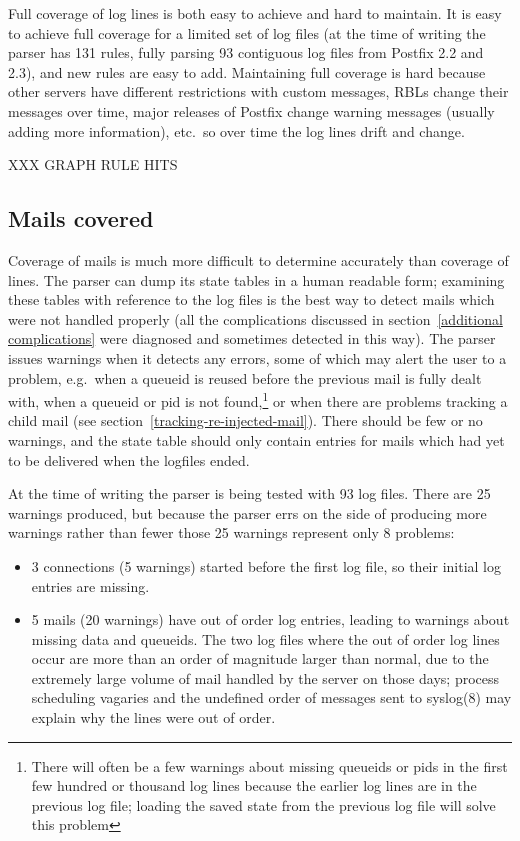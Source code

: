 \documentclass[a4paper,12pt,draft]{article}
\begin{document}
Full coverage of log lines is both easy to achieve and hard to maintain.
It is easy to achieve full coverage for a limited set of log files (at the
time of writing the parser has 131 rules, fully parsing 93 contiguous log
files from Postfix 2.2 and 2.3), and new rules are easy to add.
Maintaining full coverage is hard because other servers have different
restrictions with custom messages, RBLs change their messages over time,
major releases of Postfix change warning messages (usually adding more
information), etc.\ so over time the log lines drift and change.

XXX GRAPH RULE HITS

\subsection{Mails covered}

\label{mails-covered}

Coverage of mails is much more difficult to determine accurately than
coverage of lines.  The parser can dump its state tables in a human
readable form; examining these tables with reference to the log files is
the best way to detect mails which were not handled properly (all the
complications discussed in section~\ref{additional complications} were
diagnosed and sometimes detected in this way).  The parser issues warnings
when it detects any errors, some of which may alert the user to a problem,
e.g.\ when a queueid is reused before the previous mail is fully dealt
with, when a queueid or pid is not found,\footnote{There will often be a
few warnings about missing queueids or pids in the first few hundred or
thousand log lines because the earlier log lines are in the previous log
file; loading the saved state from the previous log file will solve this
problem} or when there are problems tracking a child mail (see
section~\ref{tracking-re-injected-mail}).  There should be few or no
warnings, and the state table should only contain entries for mails which
had yet to be delivered when the logfiles ended.

At the time of writing the parser is being tested with 93 log files.  There
are 25 warnings produced, but because the parser errs on the side of
producing more warnings rather than fewer those 25 warnings represent only
8 problems:

\begin{itemize}

    \item 3 connections (5 warnings) started before the first log file, so
        their initial log entries are missing.

    \item 5 mails (20 warnings) have out of order log entries, leading to
        warnings about missing data and queueids.  The two log files where
        the out of order log lines occur are more than an order of
        magnitude larger than normal, due to the extremely large volume of
        mail handled by the server on those days; process scheduling
        vagaries and the undefined order of messages sent to syslog(8) may
        explain why the lines were out of order.

\end{itemize}
\end{document}

